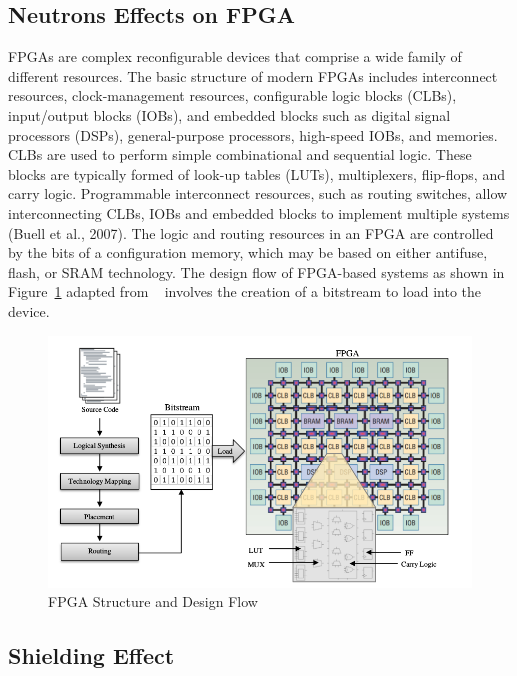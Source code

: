 \subsection{Neutrons Effects on FPGA}

FPGAs are complex reconfigurable devices that comprise a wide family of different resources. The basic structure of modern FPGAs includes interconnect resources, clock-management resources, configurable logic blocks (CLBs), input/output
blocks (IOBs), and embedded blocks such as digital signal processors (DSPs), general-purpose processors, high-speed IOBs, and memories. CLBs are used to perform simple
combinational and sequential logic. These blocks are typically formed of look-up tables
(LUTs), multiplexers, flip-flops, and carry logic. Programmable interconnect resources, such
as routing switches, allow interconnecting CLBs, IOBs and embedded blocks to implement multiple systems (Buell et al., 2007).
The logic and routing resources in an FPGA are controlled by the bits of a configuration memory, which may be based on either antifuse, flash, or SRAM technology. The
design flow of FPGA-based systems as shown in Figure~\ref{fig:fpga-struct} adapted from ~\cite{hauck2010reconfigurable} involves the creation of a bitstream to load into the
device.



\begin{figure}[tb!]
 \centering
  \captionsetup{justification=centering}    
   \includegraphics[scale=0.4]{figures/img/FPGA-structure.png}
   \caption{FPGA Structure and Design Flow}
\label{fig:fpga-struct}
\end{figure}



\subsection{Shielding Effect}

